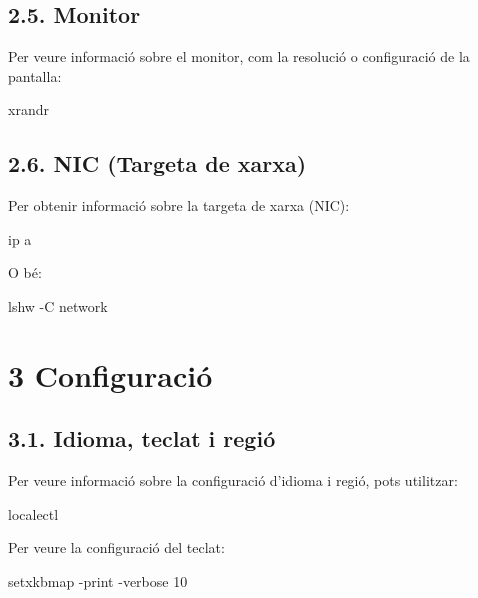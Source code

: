\documentclass[
  a4paper,
]{article}
\newenvironment{Shaded}{\begin{snugshade}}{\end{snugshade}}
\newcommand{\AttributeTok}[1]{\textcolor[rgb]{0.13,0.29,0.53}{#1}}
\newcommand{\ExtensionTok}[1]{#1}
\newcommand{\NormalTok}[1]{#1}
\begin{document}
\subsection{2.5. Monitor}\label{monitor}

Per veure informació sobre el monitor, com la resolució o configuració
de la pantalla:

\begin{Shaded}
\begin{Highlighting}[]
\ExtensionTok{xrandr}
\end{Highlighting}
\end{Shaded}

\subsection{2.6. NIC (Targeta de xarxa)}\label{nic-targeta-de-xarxa}

Per obtenir informació sobre la targeta de xarxa (NIC):

\begin{Shaded}
\begin{Highlighting}[]
\ExtensionTok{ip}\NormalTok{ a}
\end{Highlighting}
\end{Shaded}

O bé:

\begin{Shaded}
\begin{Highlighting}[]
\ExtensionTok{lshw} \AttributeTok{{-}C}\NormalTok{ network}
\end{Highlighting}
\end{Shaded}

\section{3 Configuració}\label{configuraciuxf3}

\subsection{3.1. Idioma, teclat i regió}\label{idioma-teclat-i-regiuxf3}

Per veure informació sobre la configuració d'idioma i regió, pots
utilitzar:

\begin{Shaded}
\begin{Highlighting}[]
\ExtensionTok{localectl}
\end{Highlighting}
\end{Shaded}

Per veure la configuració del teclat:

\begin{Shaded}
\begin{Highlighting}[]
\ExtensionTok{setxkbmap} \AttributeTok{{-}print} \AttributeTok{{-}verbose}\NormalTok{ 10}
\end{Highlighting}
\end{Shaded}
\end{document}
